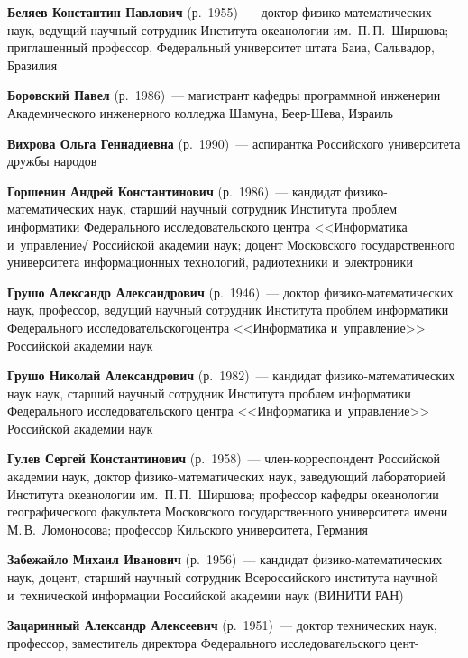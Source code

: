 \begin{multicols}{2}

\noindent
\textbf{Беляев Константин Павлович} (р.\ 1955)~---
доктор фи\-зи\-ко-ма\-те\-ма\-ти\-че\-ских наук, ведущий научный сотрудник 
Института океанологии им.\ П.\,П.~Ширшова; приглашенный профессор, 
Федеральный универси\-тет штата Баиа, Сальвадор, Бразилия

\noindent
\textbf{Боровский Павел} (р.\ 1986)~---
магистрант кафедры программной инженерии Академического инженерного колледжа 
Шамуна, Беер-Шева, Израиль 

\noindent
\textbf{Вихрова Ольга Геннадиевна} (р.\ 1990)~---
аспирантка Российского университета дружбы народов


\noindent
\textbf{Горшенин Андрей Константинович} (р.\ 1986)~---
кандидат фи\-зи\-ко-ма\-те\-ма\-ти\-че\-ских наук, старший научный 
сотрудник Института проб\-лем информатики Федерального исследовательского центра 
<<Информатика и~управ\-ле\-ние√ Российской академии наук; доцент Московского государственного университета информационных технологий,
радиотехники и~электроники


\noindent
\textbf{Грушо Александр Александрович} (р.\ 1946)~--- 
доктор фи\-зи\-ко-ма\-те\-ма\-ти\-че\-ских наук, профессор, 
ведущий научный сотрудник Института проб\-лем информатики 
Федерального исследовательского\linebreak центра <<Информатика и~управ\-ление>> 
Российской академии наук

\noindent
\textbf{Грушо Николай Александрович} (р.\ 1982)~--- кандидат 
фи\-зи\-ко-ма\-те\-ма\-ти\-че\-ских наук наук, старший научный сотрудник 
Института проб\-лем информатики 
Федерального исследовательского центра <<Информатика и~управ\-ление>> 
Российской академии наук

\noindent
\textbf{Гулев Сергей Константинович} (р.\ 1958)~---
член-кор\-рес\-пон\-дент Российской академии наук, доктор 
фи\-зи\-ко-ма\-те\-ма\-ти\-че\-ских наук, заведующий лабораторией Института 
океанологии им.\ П.\,П.~Ширшова; профессор кафедры
океанологии географического факультета
Московского государственного университета имени М.\,В.~Ломоносова; 
профессор Кильского университета, Германия 

\noindent
\textbf{Забежайло Михаил Иванович} (р.\ 1956)~---
кандидат фи\-зи\-ко-ма\-те\-ма\-ти\-че\-ских наук, доцент, старший научный 
сотрудник Всероссийского института научной и~технической информации Российской 
академии наук (ВИНИТИ РАН) 

\noindent
\textbf{Зацаринный Александр Алексеевич} (р.\ 1951)~---
доктор технических наук, профессор, заместитель директора 
Федерального исследовательского цент-\linebreak\vspace*{-12pt}


\end{multicols}
